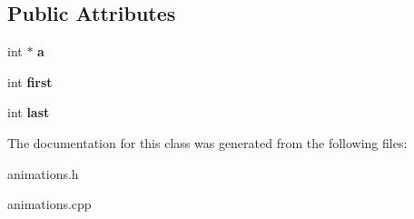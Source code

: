 \subsection*{Public Attributes}
\begin{DoxyCompactItemize}
\item 
\hypertarget{classg2c_1_1_walk_int_a8d11535301461dd83cfab7567781258a}{
int $\ast$ {\bfseries a}}
\label{classg2c_1_1_walk_int_a8d11535301461dd83cfab7567781258a}

\item 
\hypertarget{classg2c_1_1_walk_int_ad1564a81f5776f0e9b84f8e269881be8}{
int {\bfseries first}}
\label{classg2c_1_1_walk_int_ad1564a81f5776f0e9b84f8e269881be8}

\item 
\hypertarget{classg2c_1_1_walk_int_acce15f6d2ea333cb30f9691dd987cdb5}{
int {\bfseries last}}
\label{classg2c_1_1_walk_int_acce15f6d2ea333cb30f9691dd987cdb5}

\end{DoxyCompactItemize}


The documentation for this class was generated from the following files:\begin{DoxyCompactItemize}
\item 
animations.h\item 
animations.cpp\end{DoxyCompactItemize}
